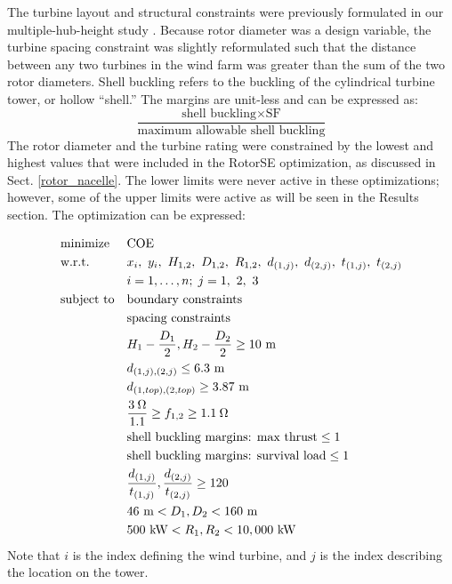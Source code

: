 \documentclass[WESD, manuscript]{copernicus}
\begin{document}
          The turbine layout and structural constraints were previously formulated in our multiple-hub-height study \citep{stanley2018}. Because rotor diameter was a design variable, the turbine spacing constraint was slightly reformulated such that the distance between any two turbines in the wind farm was greater than the sum of the two rotor diameters.
          Shell buckling refers to the buckling of the cylindrical turbine tower, or hollow ``shell.'' The margins are unit-less and can be expressed as:
$$\frac{\textrm{shell buckling}\times\textrm{SF}}{\textrm{maximum allowable shell buckling}}$$
           The rotor diameter and the turbine rating were constrained by the lowest and highest values that were included in the RotorSE optimization, as discussed in Sect. \ref{rotor_nacelle}.
           The lower limits were never active in these optimizations; however, some of the upper limits were active as will be seen in the Results section.
       The optimization can be expressed:
        
        
        \begin{equation}
			\begin{aligned}
				& \text{minimize}
					& & \text{COE} \\
                & \text{w.r.t.} 
                	&& x_i,~ y_i,~ H_{1,2},~ D_{1,2},~ R_{1,2},~ d_{(1,j)},~ d_{(2,j)},~ t_{(1,j)},~t_{(2,j)}\\
                		&&& i = 1, \ldots, n; \; j = 1,~2,~3 \\
				& \text{subject to}
					& & \text{boundary constraints} \\
						&&& \text{spacing constraints} \\
						&&& H_1-\frac{D_1}{2}, H_2-\frac{D_2}{2} \geq 10~ \text{m}\\
                		&&& d_{(1,j),(2,j)} \leq 6.3~ \text{m}\\
                		&&& d_{(1,top),(2,top)} \geq 3.87~ \text{m}\\
						&&& \frac{3\hspace{0.08cm}\Omega}{1.1} \geq f_{1,2} \geq 1.1\hspace{0.08cm}\Omega \\
                		&&& \text{shell buckling margins: max thrust} \leq 1 \\
                        &&& \text{shell buckling margins: survival load} \leq 1 \\
                		&&& \frac{d_{(1,j)}}{t_{(1,j)}},\frac{d_{(2,j)}}{t_{(2,j)}} \geq 120\\
                        &&& 46~ \text{m} < D_1,D_2 < 160~ \text{m}  \\
                        &&& 500~ \text{kW} < R_1,R_2 < 10,000~ \text{kW} \\
			\end{aligned}
		\end{equation}
%
Note that $i$ is the index defining the wind turbine, and $j$ is the index describing the location on the tower.
        
\end{document}
